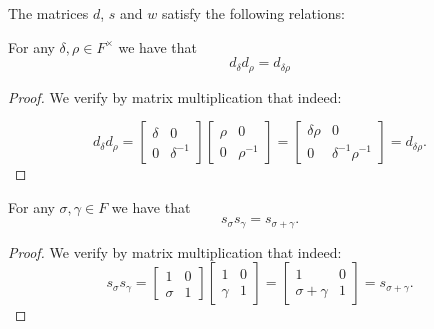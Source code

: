 The matrices $d$, $s$ and $w$ satisfy the following relations:


\begin{lemma}
\label{SpecialMatrices.d_mul_d_eq_d_mul}
\leanok
For any $\delta, \rho \in F^\times$ we have that
\[
d_\delta d_\rho = d_{\delta\rho}
\]
\end{lemma}
\begin{proof}
\leanok
    We verify by matrix multiplication that indeed:

    \begin{equation*}
        d_\delta d_\rho = \begin{bmatrix} \delta & 0 \\ 0 & \delta^{-1} \end{bmatrix} \begin{bmatrix} \rho & 0 \\ 0 & \rho^{-1} \end{bmatrix} = 
        \begin{bmatrix} \delta \rho & 0 \\ 0 & \delta^{-1} \rho^{-1} \end{bmatrix} = d_{\delta \rho}.
    \end{equation*}
\end{proof}


\begin{lemma}
\label{SpecialMatrices.s_mul_s_eq_s_add}
\leanok
    For any $\sigma, \gamma \in F$ we have that
    \[
    s_\sigma s_\gamma = s_{\sigma + \gamma}.
    \]
\end{lemma}
\begin{proof}
\leanok
    We verify by matrix multiplication that indeed:
\begin{equation*}
    s_\sigma s_\gamma = \begin{bmatrix} 1 & 0 \\ \sigma & 1 \end{bmatrix} \begin{bmatrix} 1 & 0 \\ \gamma & 1 \end{bmatrix} = \begin{bmatrix} 1 & 0 \\ \sigma + \gamma & 1 \end{bmatrix} = s_{\sigma + \gamma}.
\end{equation*}
\end{proof}


